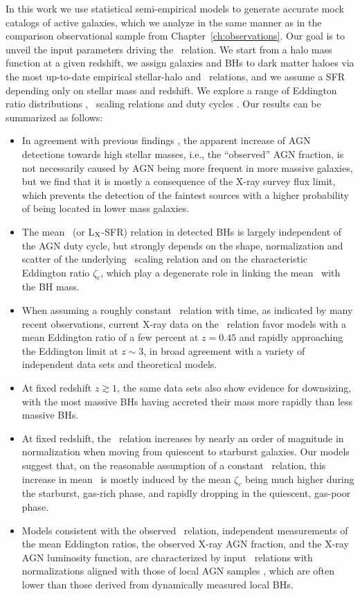 In this work we use statistical semi-empirical models to generate accurate mock catalogs of active galaxies, which we analyze in the same manner as in the comparison observational sample from Chapter~\ref{ch:observations}. Our goal is to unveil the input parameters driving the \LXMS\ relation. We start from a halo mass function at a given redshift, we assign galaxies and BHs to dark matter haloes via the most up-to-date empirical stellar-halo and \MBHMS\ relations, and we assume a SFR depending only on stellar mass and redshift. We explore a range of Eddington ratio distributions \PLz, \MBHMS\ scaling relations and duty cycles \UMBHz. Our results can be summarized as follows:
 \begin{itemize}
    \item In agreement with previous findings \citep[see, e.g.,][]{2012ApJ...746...90A,Shankar13Acc}, the apparent increase of AGN detections towards high stellar masses, i.e., the ``observed'' AGN fraction, is not necessarily caused by AGN being more frequent in more massive galaxies, but we find that it is mostly a consequence of the X-ray survey flux limit, which prevents the detection of the faintest sources with a higher probability of being located in lower mass galaxies.
    \item The mean \LXMS\ (or L$_{\rm X}$-SFR) relation in detected BHs is largely independent
    of the AGN duty cycle, but strongly depends on the shape, normalization and scatter of
    the underlying \MBHMS\ scaling relation and on the characteristic Eddington ratio
    $\zeta_c$, which play a degenerate role in linking the mean \LX\ with the BH mass. 
    \item When assuming a roughly constant \MBHMS\ relation with time, as indicated by many
    recent observations, current X-ray data on the \LXMS\ relation favor models with a mean
    Eddington ratio of a few percent at $z=0.45$ and rapidly approaching the Eddington limit
    at $z\sim 3$, in broad agreement with a variety of independent data sets and theoretical
    models. 
    \item At fixed redshift $z \gtrsim 1$, the same data sets also show evidence for downsizing, with the most massive BHs having accreted their mass more rapidly than less massive BHs.  
    \item At fixed redshift, the \LXMS\ relation increases by nearly an order of magnitude
    in normalization when moving from quiescent to starburst galaxies. Our models suggest
    that, on the reasonable assumption of a constant \MBHMS\ relation, this increase in mean
    \LX\ is mostly induced by the mean $\zeta_c$ being much higher during the starburst,
    gas-rich phase, and rapidly dropping in the quiescent, gas-poor phase. 
    \item Models consistent with the observed \LXMS\ relation, independent measurements of the mean Eddington ratios, the observed X-ray AGN fraction, and the X-ray AGN luminosity function, are characterized by input \MBHMS\ relations with normalizations aligned with those of local AGN samples \citep[e.g.,][]{2015ApJ...813...82R,2019MNRAS.485.1278S}, which are often lower than those derived from dynamically measured local BHs.
\end{itemize}
